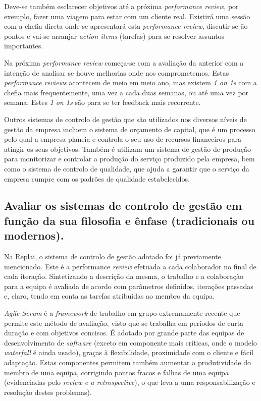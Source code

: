 Deve-se também esclarecer objetivos até a próxima \textit{performance review}, por exemplo, fazer uma viagem para estar com um cliente real. Existirá uma sessão com a chefia direta onde se apresentará esta \textit{performance review}, discutir-se-ão pontos e vai-se arranjar \textit{action items} (tarefas) para se resolver assuntos importantes.

Na próxima \textit{performance review} começa-se com a avaliação da anterior com a intenção de analisar se houve melhorias onde nos comprometemos. Estas \textit{performance reviews} acontecem de meio em meio ano, mas existem \textit{1 on 1s} com a chefia mais frequentemente, uma vez a cada duas semanas, ou até uma vez por semana. Estes \textit{1 on 1s} são para se ter feedback mais recorrente.

Outros sistemas de controlo de gestão que são utilizados nos diversos níveis de gestão da empresa incluem o sistema de orçamento de capital, que é um processo pelo qual a empresa planeia e controla o seu uso de recursos financeiros para atingir os seus objetivos.  Também é utilizam um sistema de gestão de produção para monitorizar e controlar a produção do serviço produzido pela empresa, bem como o sistema de controlo de qualidade, que ajuda a garantir que o serviço da empresa cumpre com os padrões de qualidade estabelecidos.



\subsection{Avaliar os sistemas de controlo de gestão em função da sua filosofia e ênfase (tradicionais ou modernos).}

Na Replai, o sistema de controlo de gestão adotado foi já previamente mencionado. Este é a performance \textit{review} efetuada a cada colaborador no final de cada iteração. Sintetizando a descrição da mesma, o trabalho e a colaboração para a equipa é avaliada de acordo com parâmetros definidos, iterações passadas e, claro, tendo em conta as tarefas atribuídas ao membro da equipa. 
  
\textit{Agile Scrum} é a \textit{framework} de trabalho em grupo extremamente recente que permite este método de avaliação, visto que se trabalha em períodos de curta duração e com objetivos concisos. É adotado por grande parte das equipas de desenvolvimento de \textit{software} (exceto em componente mais críticas, onde o modelo \textit{waterfall} é ainda usado), graças à flexibilidade, proximidade com o cliente e fácil adaptação. Estas componentes permitem também aumentar a produtividade do membro de uma equipa, corrigindo pontos fracos e falhas de uma equipa (evidenciadas pelo \textit{review e a retrospective}), o que leva a uma responsabilização e resolução destes problemas).
  
